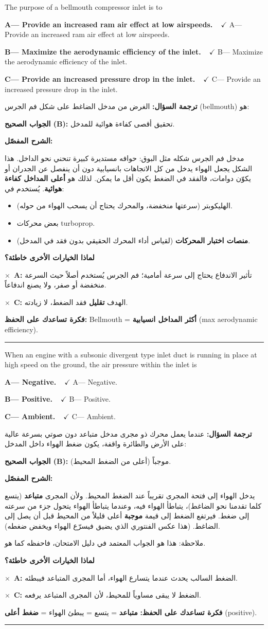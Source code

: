 \documentclass[11pt,a4paper]{article}
\newcommand{\en}[1]{\textenglish{#1}}
\newcommand{\correctletter}{}
\newcommand{\opt}[2]{%
  \ifdefstring{\correctletter}{#1}%
    {\textcolor{ansgreen}{\textbf{#1— #2\ \ $\checkmark$}}}%
    {#1— #2}\par}
\newcommand{\Q}[6]{%
  \renewcommand{\correctletter}{#6}%
  \par\bigskip
  \phantomsection\label{q#1}%
  \begin{tcolorbox}[enhanced,breakable,colback=qback,colframe=qframe,
      arc=2mm,boxrule=0.8pt,fonttitle=\bfseries,
      title={\en{Question #1}}]
    \begin{english}
      #2\par\smallskip
      \opt{A}{#3}\opt{B}{#4}\opt{C}{#5}
    \end{english}
  \end{tcolorbox}}
\newcommand{\tr}[1]{\textbf{\textcolor{qframe}{ترجمة السؤال:}} #1\par}
\newcommand{\ans}[2]{%
  \begin{tcolorbox}[colback=ansback,colframe=ansgreen,boxrule=0.6pt,arc=1.5mm,
      left=4pt,right=4pt,top=2pt,bottom=2pt]
    \textbf{\textcolor{ansgreen}{الجواب الصحيح (\en{#1}):}} #2
  \end{tcolorbox}}
\newcommand{\sharh}[1]{\textbf{\textcolor{conceptc}{الشرح المفصّل:}}\par #1\par}
\newcommand{\nohead}{\textbf{\textcolor{wrongc}{لماذا الخيارات الأخرى خاطئة؟}}\par}
\newcommand{\no}[2]{\hspace*{1em}\textcolor{wrongc}{$\times$}\ \textbf{\en{#1}:} #2\par}
\newcommand{\tip}[1]{%
  \begin{tcolorbox}[colback=tipback,colframe=tipframe,boxrule=0.5pt,arc=1.5mm,
      left=4pt,right=4pt,top=2pt,bottom=2pt]
    \textbf{فكرة تساعدك على الحفظ:} #1
  \end{tcolorbox}}
\newcommand{\qsep}{\par\medskip\noindent\textcolor{qframe!40}{\rule{\linewidth}{0.4pt}}\par}
\begin{document}
\Q{8796}{The purpose of a bellmouth compressor inlet is to}
{Provide an increased ram air effect at low airspeeds.}
{Maximize the aerodynamic efficiency of the inlet.}
{Provide an increased pressure drop in the inlet.}{B}
\tr{الغرض من مدخل الضاغط على شكل فم الجرس (\en{bellmouth}) هو:}
\ans{B}{تحقيق أقصى كفاءة هوائية للمدخل.}
\sharh{مدخل فم الجرس شكله مثل البوق: حوافه مستديرة كبيرة تنحني نحو الداخل. هذا الشكل يجعل الهواء يدخل من كل الاتجاهات بانسيابية دون أن ينفصل عن الجدران أو يكوّن دوامات، فالفقد في الضغط يكون أقل ما يمكن. لذلك هو \textbf{أعلى المداخل كفاءة هوائية}. يُستخدم في:
\begin{itemize}
  \item الهليكوبتر (سرعتها منخفضة، والمحرك يحتاج أن يسحب الهواء من حوله).
  \item بعض محركات \en{turboprop}.
  \item \textbf{منصات اختبار المحركات} (لقياس أداء المحرك الحقيقي بدون فقد في المدخل).
\end{itemize}}
\nohead
\no{A}{تأثير الاندفاع يحتاج إلى سرعة أمامية؛ فم الجرس يُستخدم أصلاً حيث السرعة منخفضة أو صفر، ولا يصنع اندفاعاً.}
\no{C}{الهدف \textbf{تقليل} فقد الضغط، لا زيادته.}
\tip{\en{Bellmouth} = \textbf{أكثر المداخل انسيابية} (\en{max aerodynamic efficiency}).}
\qsep

\Q{8800}{When an engine with a subsonic divergent type inlet duct is running in place at high speed on the ground, the air pressure within the inlet is}
{Negative.}
{Positive.}
{Ambient.}{B}
\tr{عندما يعمل محرك ذو مجرى مدخل متباعد دون صوتي بسرعة عالية على الأرض والطائرة واقفة، يكون ضغط الهواء داخل المدخل:}
\ans{B}{موجباً (أعلى من الضغط المحيط).}
\sharh{يدخل الهواء إلى فتحة المجرى تقريباً عند الضغط المحيط. ولأن المجرى \textbf{متباعد} (يتسع كلما تقدمنا نحو الضاغط)، يتباطأ الهواء فيه، وعندما يتباطأ الهواء يتحول جزء من سرعته إلى ضغط. فيرتفع الضغط إلى قيمة \textbf{موجبة} أعلى قليلاً من المحيط قبل أن يصل إلى الضاغط. (هذا عكس الفنتوري الذي يضيق فيسرّع الهواء ويخفض ضغطه).

ملاحظة: هذا هو الجواب المعتمد في دليل الامتحان، فاحفظه كما هو.}
\nohead
\no{A}{الضغط السالب يحدث عندما يتسارع الهواء، أما المجرى المتباعد فيبطئه.}
\no{C}{الضغط لا يبقى مساوياً للمحيط، لأن المجرى المتباعد يرفعه.}
\tip{\textbf{متباعد} = يتسع = يبطئ الهواء = \textbf{ضغط أعلى} (\en{positive}).}
\qsep
\end{document}
